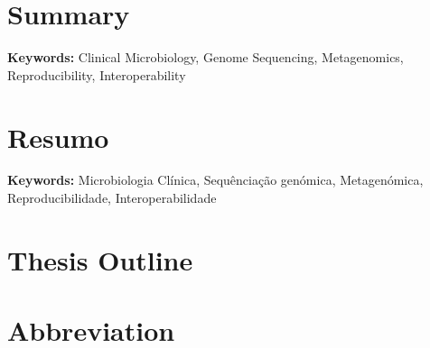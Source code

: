 \documentclass[12pt,a4paper,twoside,openright]{book}
\providecommand{\keywords}[1]{\textbf{Keywords:} #1}
\begin{document}
\begin{sloppy}
\newpage
\thispagestyle{plain}
\chapter*{Summary}


\keywords{Clinical Microbiology, Genome Sequencing, Metagenomics, Reproducibility, Interoperability}
\clearpage \thispagestyle{empty}\mbox{}\clearpage

\newpage
\thispagestyle{plain}
\chapter*{Resumo}


\keywords{Microbiologia Clínica, Sequênciação genómica, Metagenómica, Reproducibilidade, Interoperabilidade}
\clearpage \thispagestyle{empty}\mbox{}\clearpage

\newpage
\thispagestyle{plain}
\chapter*{Thesis Outline}

\clearpage \thispagestyle{empty}\mbox{}\clearpage

\newpage
\thispagestyle{plain}
\chapter*{Abbreviation}

\clearpage \thispagestyle{empty}\mbox{}\clearpage

\newpage
\thispagestyle{plain}
\renewcommand{\contentsname}{Table of Contents}
\tableofcontents
\clearpage \thispagestyle{empty}\mbox{}\clearpage
\newpage
\thispagestyle{plain}
\listoftables
\clearpage \thispagestyle{empty}\mbox{}\clearpage
\newpage
\thispagestyle{plain}
\listoffigures


\end{sloppy}
\end{document}
